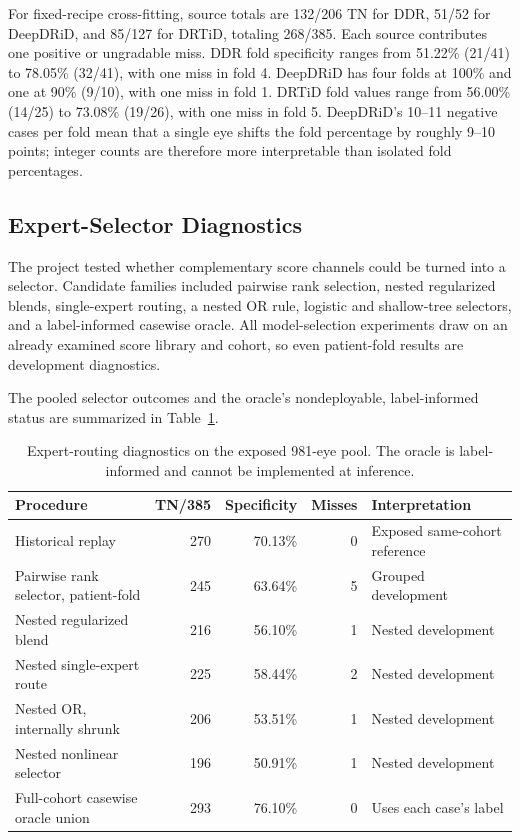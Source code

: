 \documentclass{ieeeaccess}
\begin{document}
For fixed-recipe cross-fitting, source totals are 132/206 TN for DDR, 51/52 for DeepDRiD, and 85/127 for DRTiD, totaling 268/385. Each source contributes one positive or ungradable miss. DDR fold specificity ranges from 51.22\% (21/41) to 78.05\% (32/41), with one miss in fold 4. DeepDRiD has four folds at 100\% and one at 90\% (9/10), with one miss in fold 1. DRTiD fold values range from 56.00\% (14/25) to 73.08\% (19/26), with one miss in fold 5. DeepDRiD's 10--11 negative cases per fold mean that a single eye shifts the fold percentage by roughly 9--10 points; integer counts are therefore more interpretable than isolated fold percentages.

\subsection{Expert-Selector Diagnostics}
The project tested whether complementary score channels could be turned into a selector. Candidate families included pairwise rank selection, nested regularized blends, single-expert routing, a nested OR rule, logistic and shallow-tree selectors, and a label-informed casewise oracle. All model-selection experiments draw on an already examined score library and cohort, so even patient-fold results are development diagnostics.

The pooled selector outcomes and the oracle's nondeployable, label-informed status are summarized in Table~\ref{tab:selectors}.

\begin{table}[t]
\centering
\caption{Expert-routing diagnostics on the exposed 981-eye pool. The oracle is label-informed and cannot be implemented at inference.}
\label{tab:selectors}
\begin{tabular}{lrrrl}
\toprule
Procedure & TN/385 & Specificity & Misses & Interpretation \\
\midrule
Historical replay & 270 & 70.13\% & 0 & Exposed same-cohort reference \\
Pairwise rank selector, patient-fold & 245 & 63.64\% & 5 & Grouped development \\
Nested regularized blend & 216 & 56.10\% & 1 & Nested development \\
Nested single-expert route & 225 & 58.44\% & 2 & Nested development \\
Nested OR, internally shrunk & 206 & 53.51\% & 1 & Nested development \\
Nested nonlinear selector & 196 & 50.91\% & 1 & Nested development \\
Full-cohort casewise oracle union & 293 & 76.10\% & 0 & Uses each case's label \\
\bottomrule
\end{tabular}
\end{table}
\end{document}
